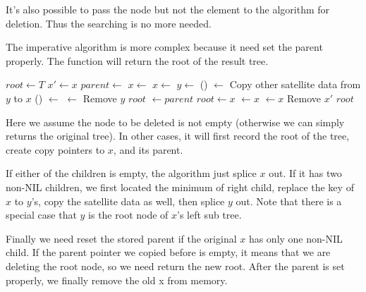 \documentclass[UTF8]{article}
\begin{document}
It's also possible to pass the node but not the element to the
algorithm for deletion. Thus the searching is no more needed.

The imperative algorithm is more complex because it need set the
parent properly. The function will return the root of the result tree.

\begin{algorithmic}[1]
  \State $root \gets T$
  \State $x' \gets x$ 
  \State $parent \gets $ 
    \State $x \gets $ 
    \State $x \gets $ 
  \Else
    \State  $y \gets $ ()
    \State {} $\gets$ 
    \State Copy other satellite data from $y$ to $x$
      \State {}() $\gets$ 
    \Else
      \State {} $\gets$ 
    \EndIf
    \State Remove $y$
    \State \Return $root$
  \EndIf
    \State {} $\gets parent$
  \EndIf
    \State $root \gets x$
  \Else
      \State {} $\gets x$
    \Else
      \State {} $\gets x$
    \EndIf
  \EndIf
  \State Remove $x'$
  \State \Return $root$
\EndFunction
\end{algorithmic}

Here we assume the node to be deleted is not empty (otherwise we can
simply returns the original tree). In other cases, it will first record
the root of the tree, create copy pointers to $x$, and its parent.

If either of the children is empty, the algorithm just splice $x$ out.
If it has two non-NIL children, we first located the minimum of right
child, replace the key of $x$ to $y$'s, copy the satellite data as
well, then splice $y$ out. Note that there is a special case that $y$
is the root node of $x$'s left sub tree.

Finally we need reset the stored parent if the original $x$ has only
one non-NIL child.
If the parent pointer we copied before is empty, it
means that we are deleting the root node, so we need return the new root. After
the parent is set properly, we finally remove the old x from memory.
\end{document}
